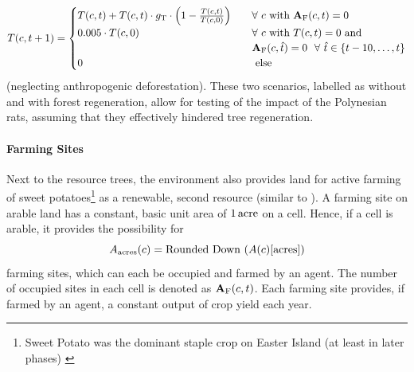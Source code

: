 \begin{equation}\label{eq:treeupdate}
T(c,t+1)= \begin{cases}
T(c,t) + T(c,t) \cdot g_{\rm T} \cdot \left(1- \frac{T(c,t)}{T(c,0)}\right) \quad & \forall \ c \text{ with } \mathbf{A}_{\rm F}(c,t)=0 \\
0.005 \cdot T(c,0)  & \forall  \ c \text{ with } T(c,t)=0 \text{ and}\\
& \mathbf{A}_{\rm F}(c,\hat{t})=0 \  \ \forall \  \hat{t} \in \{t-10, \ldots, t\} \\
0 & \text{ else }
\end{cases}
\end{equation}
(neglecting anthropogenic deforestation).
These two scenarios, labelled as without and with forest regeneration, allow for testing of the impact of the Polynesian rats, assuming that they effectively hindered tree regeneration.

\paragraph{Farming Sites}
Next to the resource trees, the environment also provides land for active farming of sweet potatoes\footnote{Sweet Potato was the dominant staple crop on Easter Island (at least in later phases) \citep{Louwagie2006}} as a renewable, second resource (similar to \citet{dAlessandro2007}).
A farming site on arable land has a constant, basic unit area of $1\, {\rm acre}$ on a cell.%
Hence, if a cell is arable, it provides the possibility for 
\begin{equation}
A_{\rm acres}(c) = \text{Rounded Down }(A(c)[\text{acres}])
\end{equation}
farming sites, which can each be occupied and farmed by an agent.
The number of occupied sites in each cell is denoted as $\mathbf{A}_{\rm F} (c, t)$.
Each farming site provides, if farmed by an agent, a constant output of crop yield each year. 

